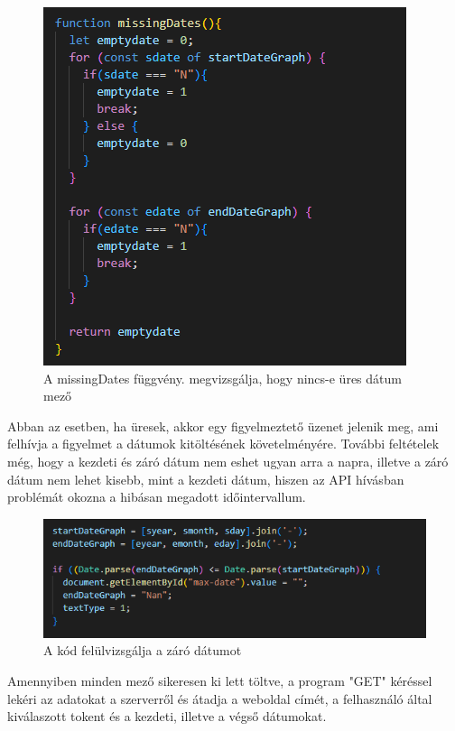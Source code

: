 \begin{figure}[h]
\centering
\includegraphics[scale=0.75]{images/dateValidation.png}
\caption{A missingDates függvény. megvizsgálja, hogy nincs-e üres dátum mező}
\label{fig:validation}
\end{figure}

Abban az esetben, ha üresek, akkor egy figyelmeztető üzenet jelenik meg, ami felhívja a figyelmet a dátumok kitöltésének követelményére. További feltételek még, hogy a kezdeti és záró dátum nem eshet ugyan arra a napra, illetve a záró dátum nem lehet kisebb, mint a kezdeti dátum, hiszen az API hívásban problémát okozna a hibásan megadott időintervallum.

\begin{figure}[h]
\centering
\includegraphics[scale=0.9]{images/emptyDate.png}
\caption{A kód felülvizsgálja a záró dátumot}
\end{figure}

Amennyiben minden mező sikeresen ki lett töltve, a program "GET" kéréssel lekéri az adatokat a szerverről és átadja a weboldal címét, a felhasználó által kiválaszott tokent és a kezdeti, illetve a végső dátumokat. 

